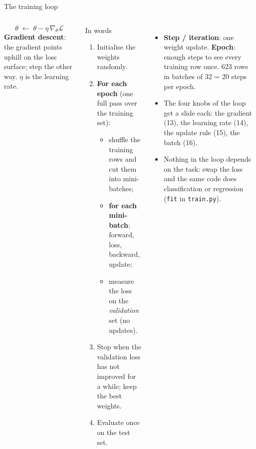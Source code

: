 \documentclass[aspectratio=169,10pt]{beamer}
\newcommand{\key}[1]{\textbf{\color{cAtt}#1}}
\begin{document}
\begin{frame}{The training loop}
\begin{columns}[T,onlytextwidth]
\vspace{1mm}
\[
  \boxed{\;\theta\;\leftarrow\;\theta-\eta\,\nabla_\theta\mathcal L\;}
\]
{\footnotesize \textbf{Gradient descent}: the gradient points uphill on the loss surface;
step the other way. $\eta$ is the learning rate.}
\small
\begin{block}{In words}
\footnotesize\setlength{\leftmargini}{1.7em}
\begin{enumerate}
  \item Initialise the weights randomly.
  \item \textbf{For each epoch} (one full pass over the training set):
  \begin{itemize}
    \item shuffle the training rows and cut them into mini-batches;
    \item \textbf{for each mini-batch}: forward, loss, backward, update;
    \item measure the loss on the \emph{validation} set (no updates).
  \end{itemize}
  \item Stop when the validation loss has not improved for a while; keep the best weights.
  \item Evaluate once on the test set.
\end{enumerate}
\end{block}
\begin{itemize}\footnotesize
  \item \key{Step / iteration}: one weight update. \key{Epoch}: enough steps to see every
        training row once. 623 rows in batches of 32 = 20 steps per epoch.
  \item The four knobs of the loop get a slide each: the gradient (13), the learning rate (14),
        the update rule (15), the batch (16).
  \item Nothing in the loop depends on the task: swap the loss and the same code does
        classification or regression (\texttt{fit} in \texttt{train.py}).
\end{itemize}
\end{columns}
\end{frame}
\end{document}
